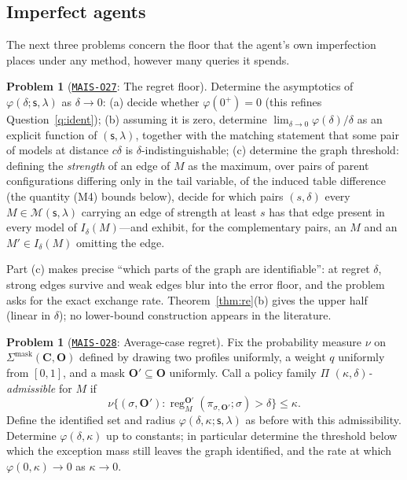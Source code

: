 \documentclass[11pt]{amsart}
\newcommand{\Oid}[1]{\href{https://github.com/lionellevine/MAIS/blob/main/open-problems/MAIS-O#1.md}{\texttt{MAIS-O#1}}}
\theoremstyle{plain}
\theoremstyle{definition}
\newtheorem{problem}[theorem]{Problem}
\DeclareMathOperator{\reg}{reg}
\newcommand{\bC}{\mathbf{C}}
\newcommand{\bO}{\mathbf{O}}
\newcommand{\MM}{\mathcal{M}}
\newcommand{\sk}{\mathsf{s}}
\begin{document}
\subsection{Imperfect agents}

The next three problems concern the floor that the agent's own imperfection places under any method, however many queries it spends.

\begin{problem}[\Oid{27}: The regret floor]\label{prob:floor}
Determine the asymptotics of $\varphi(\delta;\sk,\lambda)$ as $\delta\to0$: (a) decide whether $\varphi(0^+)=0$ (this refines Question~\ref{q:ident}); (b) assuming it is zero, determine $\lim_{\delta\to0}\varphi(\delta)/\delta$ as an explicit function of $(\sk,\lambda)$, together with the matching statement that some pair of models at distance $c\delta$ is $\delta$-indistinguishable; (c) determine the graph threshold: defining the \emph{strength} of an edge of $M$ as the maximum, over pairs of parent configurations differing only in the tail variable, of the induced table difference (the quantity (M4) bounds below), decide for which pairs $(s,\delta)$ every $M\in\MM(\sk,\lambda)$ carrying an edge of strength at least $s$ has that edge present in every model of $I_\delta(M)$---and exhibit, for the complementary pairs, an $M$ and an $M'\in I_\delta(M)$ omitting the edge.
\end{problem}

Part (c) makes precise ``which parts of the graph are identifiable'': at regret $\delta$, strong edges survive and weak edges blur into the error floor, and the problem asks for the exact exchange rate. Theorem~\ref{thm:re}(b) gives the upper half (linear in $\delta$); no lower-bound construction appears in the literature.

\begin{problem}[\Oid{28}: Average-case regret]\label{prob:average}
Fix the probability measure $\nu$ on $\Sigma^\mathrm{mask}(\bC,\bO)$ defined by drawing two profiles uniformly, a weight $q$ uniformly from $[0,1]$, and a mask $\bO'\subseteq\bO$ uniformly. Call a policy family $\Pi$ \emph{$(\kappa,\delta)$-admissible} for $M$ if
\[
   \nu\{(\sigma,\bO'):\reg_M^{\bO'}(\pi_{\sigma,\bO'};\sigma)>\delta\}\le\kappa.
\]
Define the identified set and radius $\varphi(\delta,\kappa;\sk,\lambda)$ as before with this admissibility. Determine $\varphi(\delta,\kappa)$ up to constants; in particular determine the threshold below which the exception mass still leaves the graph identified, and the rate at which $\varphi(0,\kappa)\to0$ as $\kappa\to0$.
\end{problem}
\end{document}
